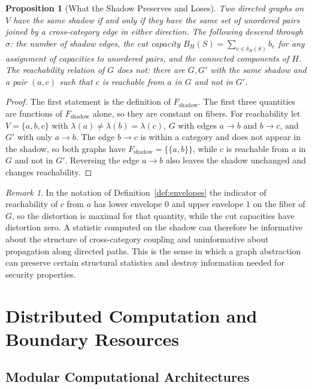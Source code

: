\documentclass[11pt,letterpaper]{report}
\theoremstyle{plain}
\newtheorem{proposition}[theorem]{Proposition}
\theoremstyle{definition}
\theoremstyle{remark}
\newtheorem{remark}[theorem]{Remark}
\begin{document}
\begin{proposition}[What the Shadow Preserves and Loses]\label{pr:shadow}
Two directed graphs on $V$ have the same shadow if and only if they have the same set of unordered pairs joined by a cross-category edge in either direction. The following descend through $\sigma$: the number of shadow edges, the cut capacity $B_H(S)=\sum_{e\in\delta_H(S)}b_e$ for any assignment of capacities to unordered pairs, and the connected components of $H$. The reachability relation of $G$ does not: there are $G,G'$ with the same shadow and a pair $(a,c)$ such that $c$ is reachable from $a$ in $G$ and not in $G'$.
\end{proposition}
\begin{proof}
The first statement is the definition of $F_{\mathrm{shadow}}$. The first three quantities are functions of $F_{\mathrm{shadow}}$ alone, so they are constant on fibers. For reachability let $V=\{a,b,c\}$ with $\lambda(a)\ne\lambda(b)=\lambda(c)$, $G$ with edges $a\to b$ and $b\to c$, and $G'$ with only $a\to b$. The edge $b\to c$ is within a category and does not appear in the shadow, so both graphs have $F_{\mathrm{shadow}}=\{\{a,b\}\}$, while $c$ is reachable from $a$ in $G$ and not in $G'$. Reversing the edge $a\to b$ also leaves the shadow unchanged and changes reachability.
\end{proof}

\begin{remark}
In the notation of Definition~\ref{def:envelopes} the indicator of reachability of $c$ from $a$ has lower envelope $0$ and upper envelope $1$ on the fiber of $G$, so the distortion is maximal for that quantity, while the cut capacities have distortion zero. A statistic computed on the shadow can therefore be informative about the structure of cross-category coupling and uninformative about propagation along directed paths. This is the sense in which a graph abstraction can preserve certain structural statistics and destroy information needed for security properties.
\end{remark}

\chapter{Distributed Computation and Boundary Resources}

\section{Modular Computational Architectures}
\end{document}
